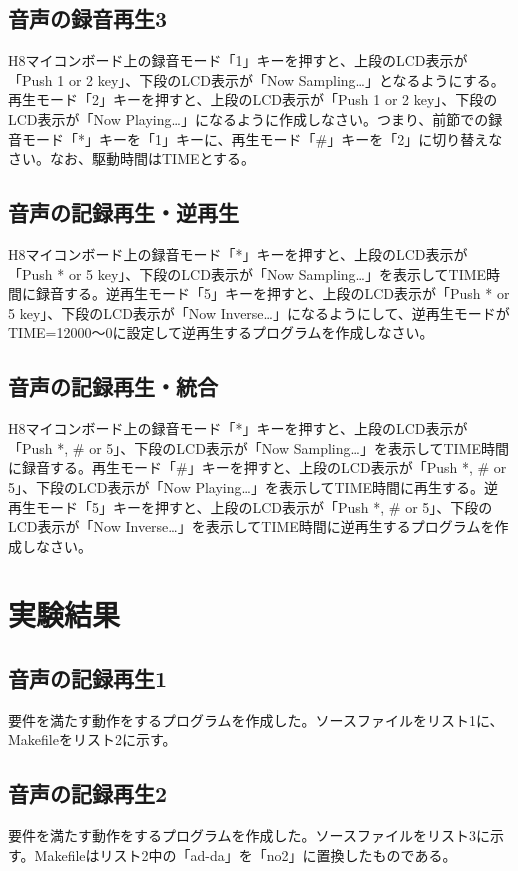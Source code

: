 \documentclass{jarticle}
\begin{document}
\subsection{音声の録音再生3}
H8マイコンボード上の録音モード「1」キーを押すと、上段のLCD表示が「Push 1 or 2 key」、下段のLCD表示が「Now Sampling…」となるようにする。再生モード「2」キーを押すと、上段のLCD表示が「Push 1 or 2 key」、下段のLCD表示が「Now Playing…」になるように作成しなさい。つまり、前節での録音モード「*」キーを「1」キーに、再生モード「\#」キーを「2」に切り替えなさい。なお、駆動時間はTIMEとする。

\subsection{音声の記録再生・逆再生}
H8マイコンボード上の録音モード「*」キーを押すと、上段のLCD表示が「Push * or 5 key」、下段のLCD表示が「Now Sampling…」を表示してTIME時間に録音する。逆再生モード「5」キーを押すと、上段のLCD表示が「Push * or 5 key」、下段のLCD表示が「Now Inverse…」になるようにして、逆再生モードがTIME=12000～0に設定して逆再生するプログラムを作成しなさい。

\subsection{音声の記録再生・統合}
H8マイコンボード上の録音モード「*」キーを押すと、上段のLCD表示が「Push *, \# or 5」、下段のLCD表示が「Now Sampling…」を表示してTIME時間に録音する。再生モード「\#」キーを押すと、上段のLCD表示が「Push *, \# or 5」、下段のLCD表示が「Now Playing…」を表示してTIME時間に再生する。逆再生モード「5」キーを押すと、上段のLCD表示が「Push *, \# or 5」、下段のLCD表示が「Now Inverse…」を表示してTIME時間に逆再生するプログラムを作成しなさい。

\section{実験結果}

\subsection{音声の記録再生1}
要件を満たす動作をするプログラムを作成した。ソースファイルをリスト1に、Makefileをリスト2に示す。

\subsection{音声の記録再生2}
要件を満たす動作をするプログラムを作成した。ソースファイルをリスト3に示す。Makefileはリスト2中の「ad-da」を「no2」に置換したものである。
\end{document}
